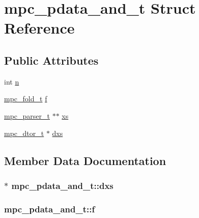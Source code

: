 \hypertarget{structmpc__pdata__and__t}{}\section{mpc\+\_\+pdata\+\_\+and\+\_\+t Struct Reference}
\label{structmpc__pdata__and__t}
\subsection*{Public Attributes}
\begin{DoxyCompactItemize}
\item 
int \hyperlink{structmpc__pdata__and__t_a13785911263f8d35d1f8723486fef6c9}{n}
\item 
\hyperlink{mpc_8h_a3b403e2e723fa36cce1cc6dd30ebd26d}{mpc\+\_\+fold\+\_\+t} \hyperlink{structmpc__pdata__and__t_af99f5c5250980acc5e4a6d0868f3b906}{f}
\item 
\hyperlink{structmpc__parser__t}{mpc\+\_\+parser\+\_\+t} $\ast$$\ast$ \hyperlink{structmpc__pdata__and__t_afd16cf6554e0bf00c550a39fbb4ac640}{xs}
\item 
\hyperlink{mpc_8h_aa06bd80d555077ce004dc04a85d2b781}{mpc\+\_\+dtor\+\_\+t} $\ast$ \hyperlink{structmpc__pdata__and__t_affcc0d07b4aeaa8916cafbef9993d042}{dxs}
\end{DoxyCompactItemize}


\subsection{Member Data Documentation}
\hypertarget{structmpc__pdata__and__t_affcc0d07b4aeaa8916cafbef9993d042}{}
\subsubsection[{dxs}]{$\ast$ mpc\+\_\+pdata\+\_\+and\+\_\+t\+::dxs}\label{structmpc__pdata__and__t_affcc0d07b4aeaa8916cafbef9993d042}
\hypertarget{structmpc__pdata__and__t_af99f5c5250980acc5e4a6d0868f3b906}{}
\subsubsection[{f}]{ mpc\+\_\+pdata\+\_\+and\+\_\+t\+::f}\label{structmpc__pdata__and__t_af99f5c5250980acc5e4a6d0868f3b906}
\hypertarget{structmpc__pdata__and__t_a13785911263f8d35d1f8723486fef6c9}{}
